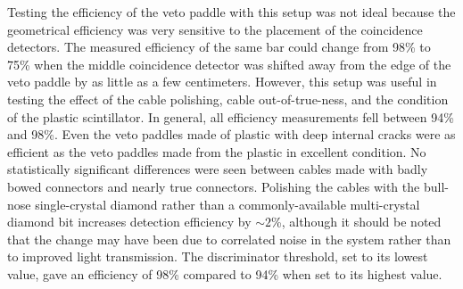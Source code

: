 Testing the efficiency of the veto paddle with this setup was not ideal because the geometrical efficiency was very sensitive to the placement of the coincidence detectors.  The measured efficiency of the same bar could change from 98\% to 75\% when the middle coincidence detector was shifted away from the edge of the veto paddle by as little as a few centimeters.  However, this setup was useful in testing the effect of the cable polishing, cable out-of-true-ness, and the condition of the plastic scintillator.  In general, all efficiency measurements fell between 94\% and 98\%.  Even the veto paddles made of plastic with deep internal cracks were as efficient as the veto paddles made from the plastic in excellent condition.  No statistically significant differences were seen between cables made with badly bowed connectors and nearly true connectors.  Polishing the cables with the bull-nose single-crystal diamond rather than a commonly-available multi-crystal diamond bit increases detection efficiency by $\sim2$\%, although it should be noted that the change may have been due to correlated noise in the system rather than to improved light transmission.  The discriminator threshold, set to its lowest value, gave an efficiency of 98\% compared to 94\% when set to its highest value.

